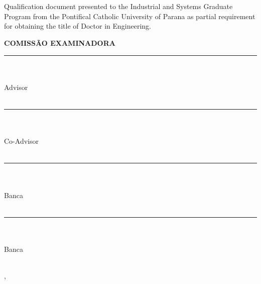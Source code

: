 \begin{center}
    {\singlespacing
    \MakeUppercase{\textbf{\aluno}} \\ [1cm]

    \MakeUppercase{\textbf{\titulo}} \\ [1cm]

    \hspace{.45\textwidth} %
        \begin{minipage}{.5\textwidth}
        \noindent Qualification document presented to the Industrial and Systems Graduate Program from the Pontifical Catholic University of Parana as partial requirement for obtaining the title of Doctor in Engineering. \\ [5mm]
        \end{minipage}
    \textbf{COMISSÃO EXAMINADORA} \\ [1cm]
    
    \rule{10cm}{.1mm} \\ \orientador \\ Advisor\\ \universidade \\ [10mm]

    \rule{10cm}{.1mm} \\ \coorientador \\ Co-Advisor \\ \universidade \\ [10mm]

    \rule{10cm}{.1mm} \\ \convidadoa \\ Banca \\ \univconvidadoa \\ [10mm]
    
    \rule{10cm}{.1mm} \\ \convidadob \\ Banca \\ \univconvidadob \\ [10mm]
    
    \vfill
    
    \cidade, \datadefesa
    }
\end{center}
